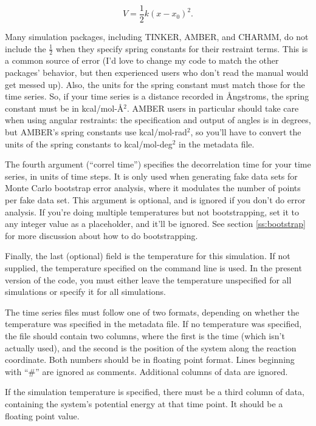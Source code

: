 \documentclass[12pt]{article}
\begin{document}
\begin{equation}
V = \frac{1}{2} k (x-x_0)^2.
\end{equation}

Many simulation packages, including TINKER, AMBER, and CHARMM, do not include
the $\frac{1}{2}$ when they specify spring constants for their restraint terms.
This is a common source of error (I'd love to change my code to match the other
packages' behavior, but then experienced users who don't read the manual would
get messed up).  Also, the units for the spring constant must match those for
the time series.  So, if your time series is a distance recorded in
{\AA}ngstroms, the spring constant must be in kcal/mol-{\AA}$^2$.  AMBER users
in particular should take care when using angular restraints: the specification
and output of angles is in degrees, but AMBER's spring constants use
kcal/mol-rad$^2$, so you'll have to convert the units of the spring constants to kcal/mol-deg$^2$ in the metadata file.

The fourth argument (``correl time'') specifies the decorrelation time for
your time series, in units of time steps.  It is only used when generating
fake data sets for Monte Carlo bootstrap error analysis, where it modulates
the number of points per fake data set.  This argument is optional, and is
ignored if you don't do error analysis.  If you're doing multiple
temperatures but not bootstrapping, set it to any integer value as a
placeholder, and it'll be ignored.  See section \ref{ss:bootstrap} for more
discussion about how to do bootstrapping.

Finally, the last (optional) field is the temperature for this simulation.  If
not supplied, the temperature specified on the command line is used.  In
the present version of the code, you must either leave the temperature
unspecified for all simulations or specify it for all simulations.

The time series files must follow one of two formats, depending on whether
the temperature was specified in the metadata file.  If no temperature was
specified, the file should contain two columns, where the first is the time
(which isn't actually used), and the second is the position of the system
along the reaction coordinate.  Both numbers should be in floating point
format.  Lines beginning with ``\#'' are ignored as comments.  Additional
columns of data are ignored.

If the simulation temperature is specified, there must be a third column of
data, containing the system's potential energy at that time point.  It
should be a floating point value.
\end{document}
